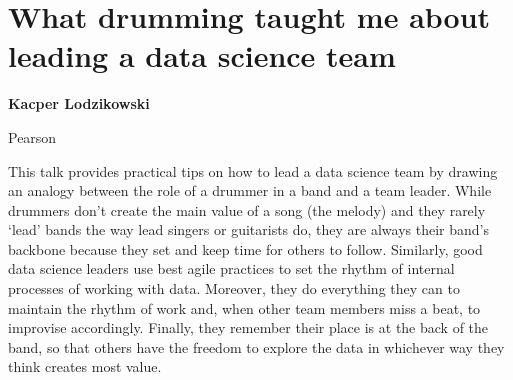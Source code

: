 \documentclass[\main/boa.tex]{subfiles}
\begin{document}
\section{What drumming taught me about leading a data science team}

\begin{minipage}{0.915\textwidth}
	\centering
  {\bf {} Kacper Lodzikowski}
\end{minipage}



\begin{affiliations}
\begin{minipage}{0.915\textwidth}
\centering
Pearson  \\[-2pt]
\end{minipage}
\end{affiliations}

\vskip 0.3cm

 This talk provides practical tips on how to lead a data science team by drawing an analogy between the role of a drummer in a band and a team leader. While drummers don’t create the main value of a song (the melody) and they rarely ‘lead’ bands the way lead singers or guitarists do, they are always their band’s backbone because they set and keep time for others to follow. Similarly, good data science leaders use best agile practices to set the rhythm of internal processes of working with data. Moreover, they do everything they can to maintain the rhythm of work and, when other team members miss a beat, to improvise accordingly. Finally, they remember their place is at the back of the band, so that others have the freedom to explore the data in whichever way they think creates most value. 
\end{document}
